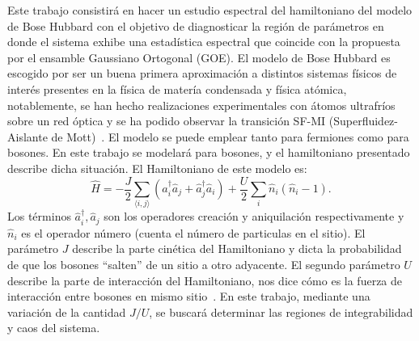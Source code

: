 \documentclass[spanish,titlepage,table]{practicas}
\begin{document}
Este trabajo consistirá en hacer un estudio espectral del hamiltoniano del modelo de Bose Hubbard 
con el objetivo de diagnosticar la región de parámetros en donde el sistema exhibe una estadística espectral 
que coincide con la propuesta por el ensamble Gaussiano Ortogonal (GOE). El modelo de Bose Hubbard es escogido por ser un buena primera aproximación a distintos sistemas físicos de interés presentes en la física de matería condensada y física atómica, notablemente, 
se han hecho realizaciones experimentales con átomos ultrafríos sobre un red óptica y se ha podido observar la transición SF-MI (Superfluidez-Aislante de Mott)~\cite{Zhang2010}. 
El modelo se puede emplear tanto para fermiones como para bosones. En este trabajo se modelará para bosones, y el hamiltoniano presentado describe dicha situación. El Hamiltoniano de este modelo es:
\begin{equation}
\hat{H}
= -\frac{J}{2} \sum_{\langle i,j\rangle} \!\left(\hat{a}_i^{\dagger}\hat{a}_j + \hat{a}_j^{\dagger}\hat{a}_i\right)
+ \frac{U}{2}\sum_{i}\hat{n}_i(\hat{n}_i - 1).
\end{equation}
Los términos $\hat{a}_i^{\dagger},\hat{a}_j$ son los operadores creación y aniquilación respectivamente y $\hat{n}_i$ es el operador número (cuenta el número de particulas en el sitio).
El parámetro $J$ describe la parte cinética del Hamiltoniano y dicta la probabilidad de que los bosones ``salten'' de un sitio a otro adyacente. El segundo parámetro $U$ describe la parte de interacción del Hamiltoniano, nos dice cómo  
es la fuerza de interacción entre bosones en mismo sitio~\cite{Zhang2010}. 
En este trabajo, mediante una variación de la cantidad $J/U$, se buscará determinar las regiones de integrabilidad y caos del sistema.
\end{document}
